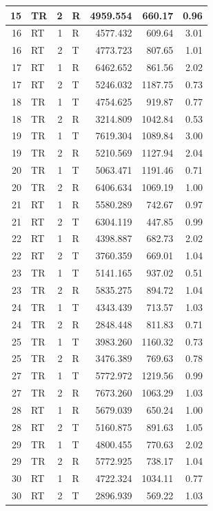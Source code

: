 \documentclass[
  10pt,
]{krantz}
\begin{document}
\begin{table}
\begin{tabular}[t]{r|l|r|l|r|r|r}
\hline
15 & TR & 2 & R & 4959.554 & 660.17 & 0.96\\
\hline
16 & RT & 1 & R & 4577.432 & 609.64 & 3.01\\
\hline
16 & RT & 2 & T & 4773.723 & 807.65 & 1.01\\
\hline
17 & RT & 1 & R & 6462.652 & 861.56 & 2.02\\
\hline
17 & RT & 2 & T & 5246.032 & 1187.75 & 0.73\\
\hline
18 & TR & 1 & T & 4754.625 & 919.87 & 0.77\\
\hline
18 & TR & 2 & R & 3214.809 & 1042.84 & 0.53\\
\hline
19 & TR & 1 & T & 7619.304 & 1089.84 & 3.00\\
\hline
19 & TR & 2 & R & 5210.569 & 1127.94 & 2.04\\
\hline
20 & TR & 1 & T & 5063.471 & 1191.46 & 0.71\\
\hline
20 & TR & 2 & R & 6406.634 & 1069.19 & 1.00\\
\hline
21 & RT & 1 & R & 5580.289 & 742.67 & 0.97\\
\hline
21 & RT & 2 & T & 6304.119 & 447.85 & 0.99\\
\hline
22 & RT & 1 & R & 4398.887 & 682.73 & 2.02\\
\hline
22 & RT & 2 & T & 3760.359 & 669.01 & 1.04\\
\hline
23 & TR & 1 & T & 5141.165 & 937.02 & 0.51\\
\hline
23 & TR & 2 & R & 5835.275 & 894.72 & 1.04\\
\hline
24 & TR & 1 & T & 4343.439 & 713.57 & 1.03\\
\hline
24 & TR & 2 & R & 2848.448 & 811.83 & 0.71\\
\hline
25 & TR & 1 & T & 3983.260 & 1160.32 & 0.73\\
\hline
25 & TR & 2 & R & 3476.389 & 769.63 & 0.78\\
\hline
27 & TR & 1 & T & 5772.972 & 1219.56 & 0.99\\
\hline
27 & TR & 2 & R & 7673.260 & 1063.29 & 1.03\\
\hline
28 & RT & 1 & R & 5679.039 & 650.24 & 1.00\\
\hline
28 & RT & 2 & T & 5160.875 & 891.63 & 1.05\\
\hline
29 & TR & 1 & T & 4800.455 & 770.63 & 2.02\\
\hline
29 & TR & 2 & R & 5772.925 & 738.17 & 1.04\\
\hline
30 & RT & 1 & R & 4722.324 & 1034.11 & 0.77\\
\hline
30 & RT & 2 & T & 2896.939 & 569.22 & 1.03\\

\end{tabular}
\end{table}
\end{document}
